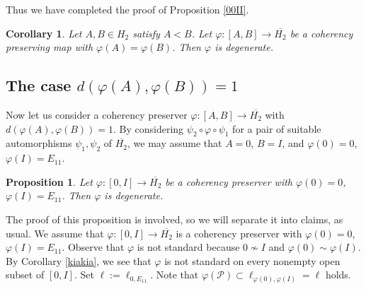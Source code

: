 \documentclass[10pt]{amsart}
\newtheorem{corollary}[theorem]{Corollary}
\newtheorem{proposition}[theorem]{Proposition}
\theoremstyle{definition}
\theoremstyle{remark}
\numberwithin{subsection}{section}
\numberwithin{equation}{section}
\newcommand\cP{{\mathcal{P}}}
\newcommand\oH{{\overline{H_2}}}
\begin{document}
Thus we have completed the proof of Proposition \ref{00II}.

\begin{corollary}\label{d=0}
Let $A, B\in H_2$ satisfy $A<B$. 
Let $\varphi\colon [A, B]\to \oH$ be a coherency preserving map with $\varphi(A)=\varphi(B)$. 
Then $\varphi$ is degenerate.
\end{corollary}







\subsection{The case $d(\varphi(A), \varphi(B))=1$}\label{dab1}

Now let us consider a coherency preserver $\varphi\colon [A, B]\to \oH$ with $d(\varphi(A), \varphi(B))=1$.  
By considering $\psi_2\circ\varphi\circ \psi_1$ for a pair of suitable automorphisms $\psi_1, \psi_2$ of $\oH$, we may assume that $A=0$, $B=I$, and $\varphi(0)=0$, $\varphi(I)=E_{11}$.

\begin{proposition}\label{E11}
Let $\varphi\colon [0, I]\to \oH$ be a coherency preserver with $\varphi(0)=0$, $\varphi(I)=E_{11}$. 
Then $\varphi$ is degenerate.
\end{proposition}

The proof of this proposition is involved, so we will separate it into claims, as usual.
We assume that $\varphi\colon [0, I]\to \oH$ is a coherency preserver with $\varphi(0)=0$, $\varphi(I)=E_{11}$. 
Observe that $\varphi$ is not standard because $0\not\sim I$ and $\varphi(0)\sim \varphi(I)$. 
By Corollary \ref{kiakia}, we see that $\varphi$ is not standard on every nonempty open subset of $[0, I]$.
Set $\ell:=\ell_{0, E_{11}}$. 
Note that $\varphi(\cP)\subset \ell_{\varphi(0), \varphi(I)}=\ell$ holds.
\end{document}

